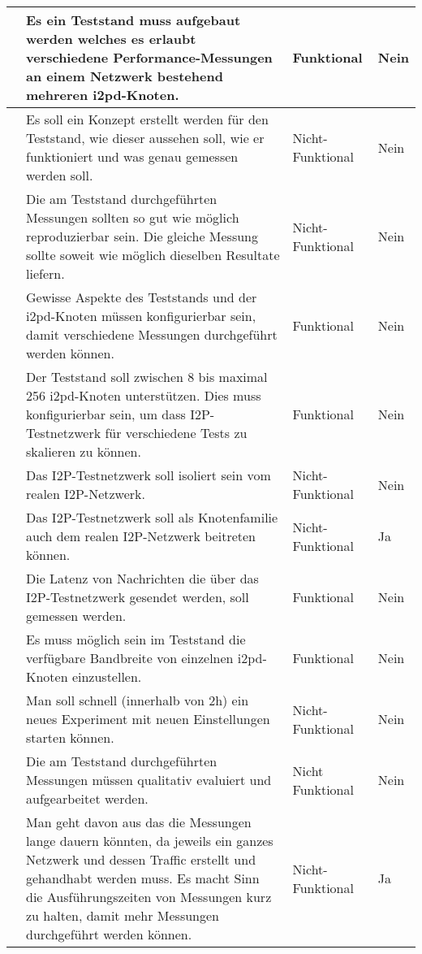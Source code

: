 \begin{longtable}{N p{8.5cm} l l}
      & Es ein Teststand muss aufgebaut werden welches es erlaubt verschiedene Performance-Messungen
                  an einem Netzwerk bestehend mehreren i2pd-Knoten. & Funktional & Nein \\ \midrule
      & Es soll ein Konzept erstellt werden für den Teststand, wie dieser aussehen soll, wie er funktioniert und was genau gemessen werden soll. & Nicht-Funktional & Nein \\ \midrule
      & Die am Teststand durchgeführten Messungen sollten so gut wie möglich reproduzierbar sein. Die gleiche Messung sollte soweit wie möglich dieselben Resultate liefern. & Nicht-Funktional & Nein \\ \midrule
      & Gewisse Aspekte des Teststands und der i2pd-Knoten müssen konfigurierbar sein, damit verschiedene Messungen durchgeführt werden können.  & Funktional & Nein \\ \midrule
      & Der Teststand soll zwischen 8 bis maximal 256 i2pd-Knoten unterstützen. Dies muss konfigurierbar sein, um dass I2P-Testnetzwerk für verschiedene Tests zu skalieren zu können. & Funktional & Nein \\ \midrule
      & Das I2P-Testnetzwerk soll isoliert sein vom realen I2P-Netzwerk. & Nicht-Funktional & Nein \\ \midrule
      & Das I2P-Testnetzwerk soll als Knotenfamilie auch dem realen I2P-Netzwerk beitreten können. & Nicht-Funktional & Ja \\ \midrule
      & Die Latenz von Nachrichten die über das I2P-Testnetzwerk gesendet werden, soll gemessen werden. & Funktional & Nein \\ \midrule
      & Es muss möglich sein im Teststand die verfügbare Bandbreite von einzelnen i2pd-Knoten einzustellen. & Funktional & Nein \\ \midrule
      & Man soll schnell (innerhalb von 2h) ein neues Experiment mit neuen Einstellungen starten können. & Nicht-Funktional & Nein \\ \midrule
      & Die am Teststand durchgeführten Messungen müssen qualitativ evaluiert und aufgearbeitet werden.  & Nicht Funktional & Nein \\ \midrule
      & Man geht davon aus das die Messungen lange dauern könnten, da jeweils ein ganzes Netzwerk und dessen Traffic erstellt und gehandhabt werden muss. Es macht Sinn die Ausführungszeiten von Messungen kurz zu halten, damit mehr Messungen durchgeführt werden können. & Nicht-Funktional & Ja \\ \midrule

\end{longtable}
